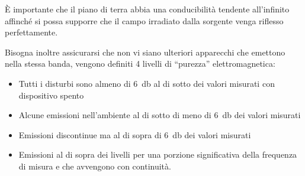 È importante che il piano di terra abbia una conducibilità tendente all'infinito affinché si possa supporre
che il campo irradiato dalla sorgente venga riflesso perfettamente.

Bisogna inoltre assicurarsi che non vi siano ulteriori apparecchi che emettono nella stessa banda, vengono
definiti 4 livelli di ``purezza'' elettromagnetica:
\begin{itemize}
\item Tutti i disturbi sono almeno di \SI{6}{\decibel} al di sotto dei valori misurati con dispositivo spento
\item Alcune emissioni nell'ambiente al di sotto di meno di \SI{6}{\decibel} dei valori misurati
\item Emissioni discontinue ma al di sopra di \SI{6}{\decibel} dei valori misurati
\item Emissioni al di sopra dei livelli per una porzione significativa della frequenza di misura e che 
avvengono con continuità.
\end{itemize}
